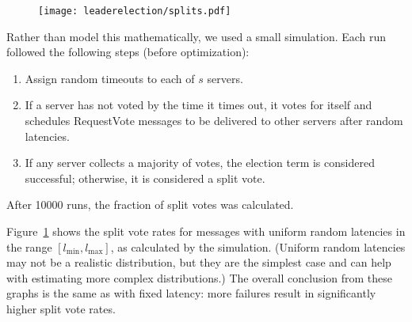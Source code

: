 \begin{figure}
\centering
\texttt{[image: leaderelection/splits.pdf]}
\vspace{-3ex}
\label{fig:leaderelection:theory:splitvotes}
\end{figure}

Rather than model this mathematically, we used a small simulation. Each
run followed the following steps (before optimization):
%
\begin{enumerate}
%
\item Assign random timeouts to each of $s$ servers.
%
\item If a server has not voted by the time it times out, it votes for
itself and schedules RequestVote messages to be delivered to other
servers after random latencies.
%
\item If any server collects a majority of votes, the election term is
considered successful; otherwise, it is considered a split vote.
%
\end{enumerate}
%
After \num{10000} runs, the fraction of split votes was calculated.

Figure~\ref{fig:leaderelection:theory:splitvotes} shows the split vote
rates for messages with uniform random latencies in the range
$[l_\text{min},l_\text{max}]$, as calculated by the simulation.
(Uniform random latencies may not be a realistic distribution, but they
are the simplest case and can help with estimating more complex
distributions.)
The overall conclusion from these graphs is the same as
with fixed latency: more failures result in significantly higher split
vote rates.

